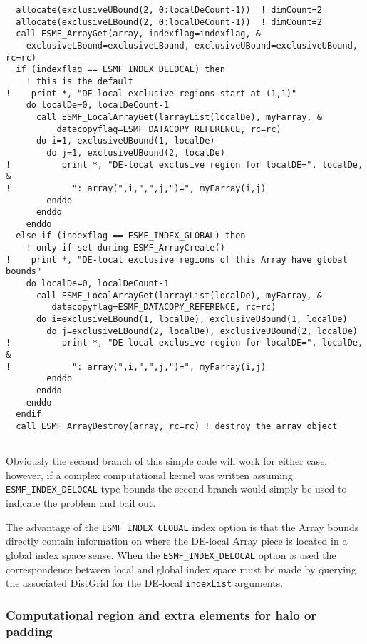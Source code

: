  \begin{verbatim}
  allocate(exclusiveUBound(2, 0:localDeCount-1))  ! dimCount=2
  allocate(exclusiveLBound(2, 0:localDeCount-1))  ! dimCount=2
  call ESMF_ArrayGet(array, indexflag=indexflag, &
    exclusiveLBound=exclusiveLBound, exclusiveUBound=exclusiveUBound, rc=rc)
  if (indexflag == ESMF_INDEX_DELOCAL) then
    ! this is the default
!    print *, "DE-local exclusive regions start at (1,1)"
    do localDe=0, localDeCount-1
      call ESMF_LocalArrayGet(larrayList(localDe), myFarray, &
          datacopyflag=ESMF_DATACOPY_REFERENCE, rc=rc)
      do i=1, exclusiveUBound(1, localDe)
        do j=1, exclusiveUBound(2, localDe)
!          print *, "DE-local exclusive region for localDE=", localDe, &
!            ": array(",i,",",j,")=", myFarray(i,j)
        enddo
      enddo
    enddo
  else if (indexflag == ESMF_INDEX_GLOBAL) then
    ! only if set during ESMF_ArrayCreate()
!    print *, "DE-local exclusive regions of this Array have global bounds"
    do localDe=0, localDeCount-1
      call ESMF_LocalArrayGet(larrayList(localDe), myFarray, &
         datacopyflag=ESMF_DATACOPY_REFERENCE, rc=rc)
      do i=exclusiveLBound(1, localDe), exclusiveUBound(1, localDe)
        do j=exclusiveLBound(2, localDe), exclusiveUBound(2, localDe)
!          print *, "DE-local exclusive region for localDE=", localDe, &
!            ": array(",i,",",j,")=", myFarray(i,j)
        enddo
      enddo
    enddo
  endif
  call ESMF_ArrayDestroy(array, rc=rc) ! destroy the array object
 
\end{verbatim}
 

   Obviously the second branch of this simple code will work for either case, 
   however, if a complex computational kernel was written assuming 
   {\tt ESMF\_INDEX\_DELOCAL} type bounds the second branch would simply be 
   used to indicate the problem and bail out.
  
   The advantage of the {\tt ESMF\_INDEX\_GLOBAL} index option is that
   the Array bounds directly contain information on where the DE-local
   Array piece is located in a global index space sense. When the
   {\tt ESMF\_INDEX\_DELOCAL} option is used the correspondence between local
   and global index space must be made by querying the associated DistGrid for
   the DE-local {\tt indexList} arguments.
 
 
   \subsubsection{Computational region and extra elements for halo or padding}
   \label{Array:padding}
  
